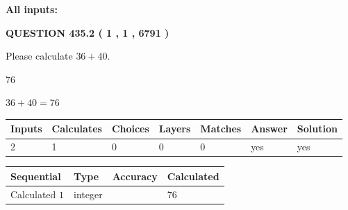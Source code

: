 \documentclass[12pt]{article}
\begin{document}
   
   
   
\noindent\vspace{0.1in}\hspace{-0.08in} {\textbf{\Large{All inputs: }}}
   
   
  
\vspace{0.2in}
  
{\textbf{\Large{QUESTION
435.2 
 ( 1 , 1 , 6791 )
}}}
  
  
 
Please calculate $ %
36 +  %
40 $.
 
 
 
\noindent{}
 
 

76
 
 
\noindent{}
 
 

 
 
 
\noindent{}
 
 

$ %
36 +  %
40=   %
76$
 
 
\noindent{}
 
 

 
   
   
   
   
\noindent\begin{tabular}{|l|l|l|l|l|l|l|}
 \hline
Inputs & Calculates & Choices & Layers & Matches & Answer & Solution \\ \hline
 2  & 
 1  & 
 0
  & 
 0  & 
 0  & 
  yes & 
  yes 
  \\ \hline
 \end{tabular}
   
   
   
   
\noindent{}
   
   
  
  
\noindent\begin{tabular}{|l|l|l|l|}
\hline
 Sequential & Type & Accuracy & Calculated \\ 
\hline
 
 
  Calculated $  1 $ & integer &  & 
  $ 76 $ 
 \\  \hline  
 \end{tabular}
   
\end{document}
